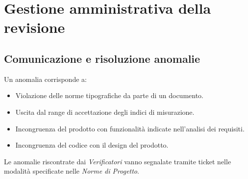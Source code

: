 \section{Gestione amministrativa della revisione}
	\subsection{Comunicazione e risoluzione anomalie}
	Un anomalia corrisponde a:
	\begin{itemize}
		\item Violazione delle norme tipografiche da parte di un documento.
		\item Uscita dal range di accettazione degli indici di misurazione. %
		\item Incongruenza del prodotto con funzionalità indicate nell'analisi dei requisiti.
		\item Incongruenza del codice con il design del prodotto.
	\end{itemize}
	Le anomalie riscontrate dai \emph{Verificatori} vanno segnalate tramite ticket nelle modalità specificate nelle \emph{Norme di Progetto}.
	
	
